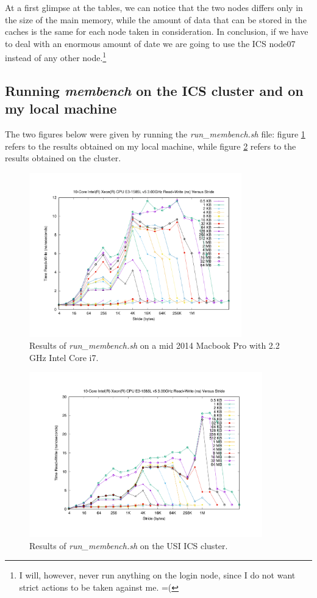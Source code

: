 \documentclass[unicode,11pt,a4paper,oneside,numbers=endperiod,openany]{scrartcl}
\begin{document}
At a first glimpse at the tables, we can notice that the two nodes differs only in the size of the main memory, while the amount of data that can be stored in the caches is the same for each node taken in consideration. In conclusion, if we have to deal with an enormous amount of date we are going to use the ICS node07 instead of any other node.\footnote{I will, however, never run anything on the login node, since I do not want strict actions to be taken against me. =(}

\subsection{Running \textit{membench} on the ICS cluster and on my local machine}
The two figures below were given by running the \textit{run\_membench.sh} file: figure \ref{fig:membenchlocal} refers to the results obtained on my local machine, while figure \ref{fig:membenchcluster} refers to the results obtained on the cluster.

\begin{figure}[h!]
	\centering
	\includegraphics[width=0.82\textwidth]{Figures/local_results.pdf}
	\caption{Results of \textit{run\_membench.sh} on a mid 2014 Macbook Pro with 2.2 GHz Intel Core i7.}\label{fig:membenchlocal}
\end{figure}
\begin{figure}[h!]
	\centering
	\includegraphics[width=0.90\textwidth]{Figures/generic.pdf}
	\caption{Results of \textit{run\_membench.sh} on the USI ICS cluster.}\label{fig:membenchcluster}
\end{figure}
\end{document}
